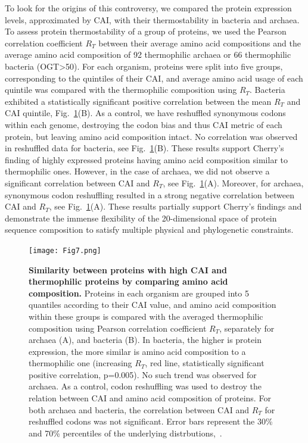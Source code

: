 \documentclass[10pt,letterpaper]{article}
\begin{document}
To look for the origins of this controversy, we compared the protein expression levels, approximated by CAI, with their thermostability in bacteria and archaea. To assess protein thermostability of a group of proteins, we used the Pearson correlation coefficient $R_T$ between their average amino acid compositions and the average amino acid composition of 92 thermophilic archaea or 66 thermophilic bacteria (OGT\textgreater50\textcelsius). For each organism, proteins were split into five groups, corresponding to the quintiles of their CAI, and average amino acid usage of each quintile was compared with the thermophilic composition using $R_T$. Bacteria exhibited a statistically significant positive correlation between the mean $R_T$ and CAI quintile, Fig.~\ref{fig:fig7}(B). As a control, we have reshuffled synonymous codons within each genome, destroying the codon bias and thus CAI metric of each protein, but leaving amino acid composition intact. No correlation was observed in reshuffled data for bacteria, see Fig.~\ref{fig:fig7}(B). These results support Cherry's finding of highly expressed proteins having amino acid composition similar to thermophilic ones. However, in the case of archaea, we did not observe a significant correlation between CAI and $R_T$, see Fig.~\ref{fig:fig7}(A). Moreover, for archaea, synonymous codon reshuffling resulted in a strong negative correlation between CAI and $R_T$, see Fig.~\ref{fig:fig7}(A). These results partially support Cherry's findings and demonstrate the immense flexibility of the 20-dimensional space of protein sequence composition to satisfy multiple physical and phylogenetic constraints.


\begin{figure}[h!]
\texttt{[image: Fig7.png]}
\caption{
{\bf Similarity between proteins with high CAI and thermophilic proteins by comparing amino acid composition.}
Proteins in each organism are grouped into 5 quantiles according to their CAI value, and amino acid composition within these groups is compared with the averaged thermophilic composition using Pearson correlation coefficient $R_T$, separately for archaea (A), and bacteria (B). In bacteria, the higher is protein expression, the more similar is amino acid composition to a thermophilic one (increasing $R_T$, red line, statistically significant positive correlation, p=0.005). No such trend was observed for archaea. As a control, codon reshuffling was used to destroy the relation between CAI and amino acid composition of proteins. For both archaea and bacteria, the correlation between CAI and $R_T$ for reshuffled codons was not significant.  Error bars represent the 30\% and 70\% percentiles of the underlying distrbutions,~.
}
\label{fig:fig7}
\end{figure}
\end{document}
